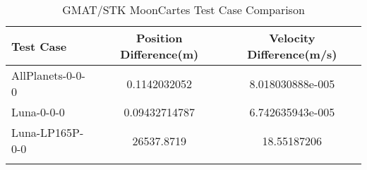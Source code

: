 \begin{table}[htbp!]
\centering
\caption{ GMAT/STK MoonCartes Test Case Comparison}
      \begin{tabular}{lcc}
      \hline\hline
          Test Case & Position Difference(m) & Velocity Difference(m/s) \\
         \hline
         AllPlanets-0-0-0 & 0.1142032052 & 8.018030888e-005 \\
         Luna-0-0-0 & 0.09432714787 & 6.742635943e-005 \\
         Luna-LP165P-0-0 & 26537.8719 & 18.55187206 \\
      \hline\hline
      \label{Table: MoonCartesTable} 
\end{tabular}
\end{table}
